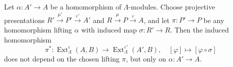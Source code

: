 Let $\alpha : A' \to A$ be a homomorphism of $\Lambda$-modules. Choose projective presentations $R' \xrightarrow{\mu'} P' \xrightarrow{\varepsilon'} A'$ and $R \xrightarrow{\mu} P \xrightarrow{\varepsilon} A$, and let $\pi : P' \to P$ be any homomorphism lifting $\alpha$ with induced map $\sigma : R' \to R$. Then the induced homomorphism
$$\pi^* : \operatorname{Ext}_{\Lambda}^{\varepsilon}(A, B) \longrightarrow \operatorname{Ext}_{\Lambda}^{\varepsilon'}(A', B), \quad [\varphi] \mapsto [\varphi \circ \sigma]$$
does not depend on the chosen lifting $\pi$, but only on $\alpha : A' \to A$.
